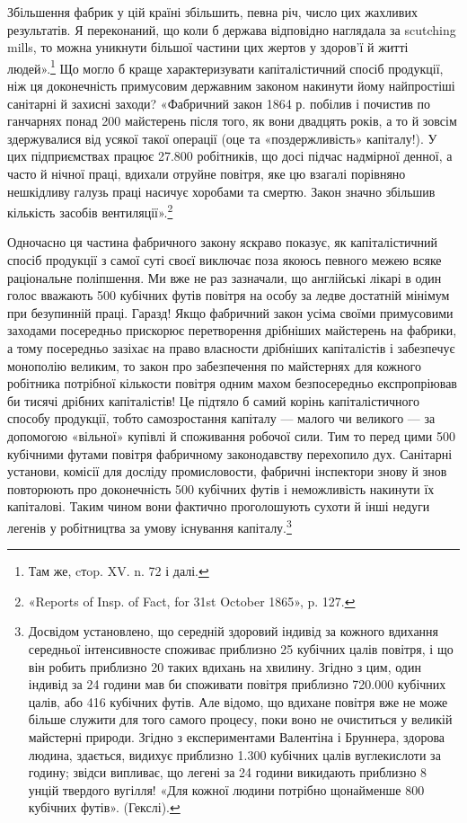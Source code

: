 \parcont{}  %
Збільшення фабрик у цій країні збільшить, певна річ, число цих
жахливих результатів. Я переконаний, що коли б держава відповідно наглядала за
scutching mills, то можна уникнути більшої частини цих жертов у здоров’ї й
житті людей».\footnote{
Там же, cтop. XV. n. 72 і далі.
} Що могло б краще характеризувати капіталістичний спосіб продукції, ніж
ця доконечність примусовим державним законом накинути йому
найпростіші санітарні й захисні заходи? «Фабричний закон 1864 р.
побілив і почистив по ганчарнях понад 200 майстерень після
того, як вони двадцять років, а то й зовсім здержувалися від
усякої такої операції (оце та «поздержливість» капіталу!). У цих
підприємствах працює 27.800 робітників, що досі підчас надмірної денної, а
часто й нічної праці, вдихали отруйне повітря,
яке цю взагалі порівняно нешкідливу галузь праці насичує
хоробами та смертю. Закон значно збільшив кількість засобів
вентиляції».\footnote{
«Reports of Insp. of Fact, for 31st October 1865», p. 127.
}

Одночасно ця частина фабричного закону яскраво показує, як
капіталістичний спосіб продукції з самої суті своєї виключає
поза якоюсь певного межею всяке раціональне поліпшення. Ми
вже не раз зазначали, що англійські лікарі в один голос вважають
500 кубічних футів повітря на особу за ледве достатній мінімум
при безупинній праці. Гаразд! Якщо фабричний закон усіма
своїми примусовими заходами посередньо прискорює перетворення дрібніших
майстерень на фабрики, а тому посередньо
зазіхає на право власности дрібніших капіталістів і забезпечує
монополію великим, то закон про забезпечення по майстернях
для кожного робітника потрібної кількости повітря одним махом
безпосередньо експропріював би тисячі дрібних капіталістів!
Це підтяло б самий корінь капіталістичного способу продукції,
тобто самозростання капіталу — малого чи великого — за допомогою «вільної»
купівлі й споживання робочої сили. Тим то
перед цими 500 кубічними футами повітря фабричному законодавству перехопило
дух. Санітарні установи, комісії для досліду промисловости, фабричні інспектори
знову й знов повторюють про доконечність 500
кубічних футів і неможливість накинути їх капіталові.
Таким чином вони фактично проголошують
сухоти й інші недуги легенів у робітництва за умову існування
капіталу.\footnote{
Досвідом установлено, що середній здоровий індивід за кожного
вдихання середньої інтенсивносте споживає приблизно 25 кубічних
цалів  повітря, і що він робить приблизно 20 таких вдихань на хвилину. Згідно з
цим, один індивід за 24 години мав би споживати повітря приблизно 720.000
кубічних цалів, або 416 кубічних футів. Але
відомо, що вдихане повітря вже не може більше служити для того самого
процесу, поки воно не очиститься у великій майстерні природи. Згідно
з експериментами Валентіна і Бруннера, здорова людина, здається, видихує
приблизно 1.300 кубічних цалів вуглекислоти за годину; звідси
випливає, що легені за 24 години викидають приблизно 8 унцій твердого
вугілля! «Для кожної людини потрібно щонайменше 800 кубічних
футів». (Гекслі).
}
